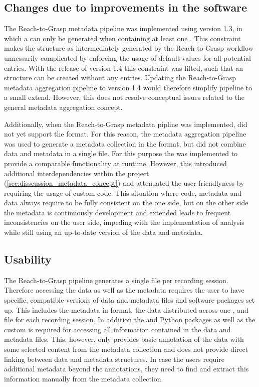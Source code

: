 \subsection{Changes due to improvements in the software}
The Reach-to-Grasp metadata pipeline was implemented using  version 1.3, in which a   can only be generated when containing at least one . This constraint makes the  structure as intermediately generated by the Reach-to-Grasp workflow unnessarily complicated by enforcing the usage of default values for all potential  entries. With the release of  version 1.4 this constraint was lifted, such that an  structure can be created without any  entries. Updating the Reach-to-Grasp metadata aggregation pipeline to  version 1.4 would therefore simplify pipeline to a small extend. However, this does not resolve conceptual issues related to the general metadata aggregation concept.

Additionally, when the Reach-to-Grasp metadata pipline was implemented,  did not yet support the  format. For this reason, the metadata aggregation pipeline was used to generate a metadata collection in the  format, but did not combine data and metadata in a single file. For this purpose the  was implemented to provide a comparable functionality at runtime. However, this introduced additional interdependencies within the project (\cref{sec:disscussion_metadata_concept}) and attenuated the user-friendlyness by requiring the usage of custom code. This situation where code, metadata and data always require to be fully consistent on the one side, but on the other side the metadata is continuously development and extended  leads to frequent inconsistencies on the user side, impeding with the implementation of analysis while still using an up-to-date version of the data and metadata.


\subsection{Usability}
The Reach-to-Grasp pipeline generates a single  file per recording session. Therefore accessing the data as well as the metadata requires the user to have  specific, compatible versions of data and metadata files and software packages set up. This includes the metadata in  format, the data distributed across one ,  and  file for each recording session. In addition the  and  Python packages as well as the custom  is required for accessing all information contained in the data and metadata files. This, however, only provides basic annotation of the data with some selected content from the metadata collection and does not provide direct linking between data and metadata structures. In case the users require additional metadata beyond the annotations, they need to find and extract this information manually from the metadata collection.


